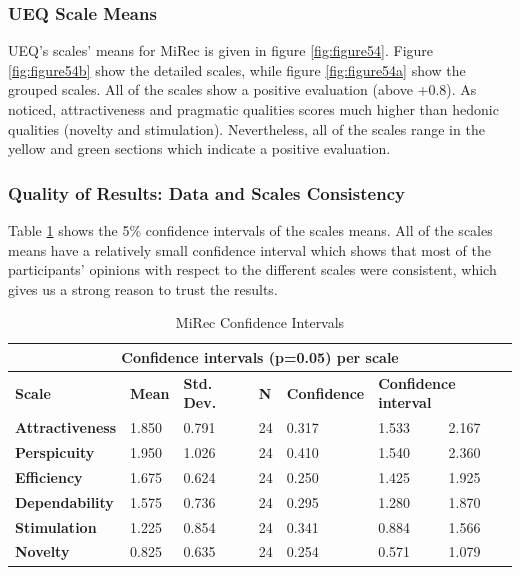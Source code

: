 \subsubsection{UEQ Scale Means}
UEQ's scales' means for MiRec is given in figure \ref{fig:figure54}. Figure
\ref{fig:figure54b} show the detailed scales, while figure \ref{fig:figure54a}
show the grouped scales. All of the scales show a positive evaluation (above
+0.8). As noticed, attractiveness and pragmatic qualities scores much higher
than hedonic qualities (novelty and stimulation). Nevertheless, all of the scales range in
the yellow and green sections which indicate a positive evaluation.
\subsubsection{Quality of Results: Data and Scales Consistency}
Table \ref{table:table55} shows the 5\% confidence intervals of
the scales means. All of the scales means have a relatively small confidence
interval which shows that most of the participants' opinions with respect to
the different scales were consistent, which gives us a strong reason to trust
the results.
\begin{table}[!htbp]
\tiny 
\centering
\begin{tabular}{|l|l|l|l|l|l|l|}
\hline
\multicolumn{7}{|c|}{\textbf{Confidence intervals (p=0.05) per scale}}                                                                              \\ \hline
\textbf{Scale}          & \textbf{Mean} & \textbf{Std. Dev.} & \textbf{N} & \textbf{Confidence} & \multicolumn{2}{l|}{\textbf{Confidence interval}} \\ \hline
\textbf{Attractiveness} & 1.850         & 0.791              & 24         & 0.317               & 1.533                   & 2.167                   \\ \hline
\textbf{Perspicuity}    & 1.950         & 1.026              & 24         & 0.410               & 1.540                   & 2.360                   \\ \hline
\textbf{Efficiency}     & 1.675         & 0.624              & 24         & 0.250               & 1.425                   & 1.925                   \\ \hline
\textbf{Dependability}  & 1.575         & 0.736              & 24         & 0.295               & 1.280                   & 1.870                   \\ \hline
\textbf{Stimulation}    & 1.225         & 0.854              & 24         & 0.341               & 0.884                   & 1.566                   \\ \hline
\textbf{Novelty}        & 0.825         & 0.635              & 24         & 0.254               & 0.571                   & 1.079                   \\ \hline
\end{tabular}
\caption{MiRec Confidence Intervals}
\label{table:table55}
\end{table}
